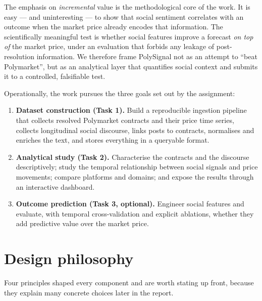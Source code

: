 
\noindent The emphasis on \emph{incremental} value is the methodological core of the
work. It is easy --- and uninteresting --- to show that social sentiment correlates
with an outcome when the market price already encodes that information. The
scientifically meaningful test is whether social features improve a forecast
\emph{on top of} the market price, under an evaluation that forbids any leakage of
post-resolution information. We therefore frame PolySignal not as an attempt to
``beat Polymarket'', but as an analytical layer that quantifies social context and
submits it to a controlled, falsifiable test.

\noindent Operationally, the work pursues the three goals set out by the assignment:
\begin{enumerate}
  \item \textbf{Dataset construction (Task 1).} Build a reproducible ingestion
  pipeline that collects resolved Polymarket contracts and their price time series,
  collects longitudinal social discourse, links posts to contracts, normalises and
  enriches the text, and stores everything in a queryable format.
  \item \textbf{Analytical study (Task 2).} Characterise the contracts and the
  discourse descriptively; study the temporal relationship between social signals
  and price movements; compare platforms and domains; and expose the results through
  an interactive dashboard.
  \item \textbf{Outcome prediction (Task 3, optional).} Engineer social features and
  evaluate, with temporal cross-validation and explicit ablations, whether they add
  predictive value over the market price.
\end{enumerate}

\section{Design philosophy}
Four principles shaped every component and are worth stating up front, because they
explain many concrete choices later in the report.

